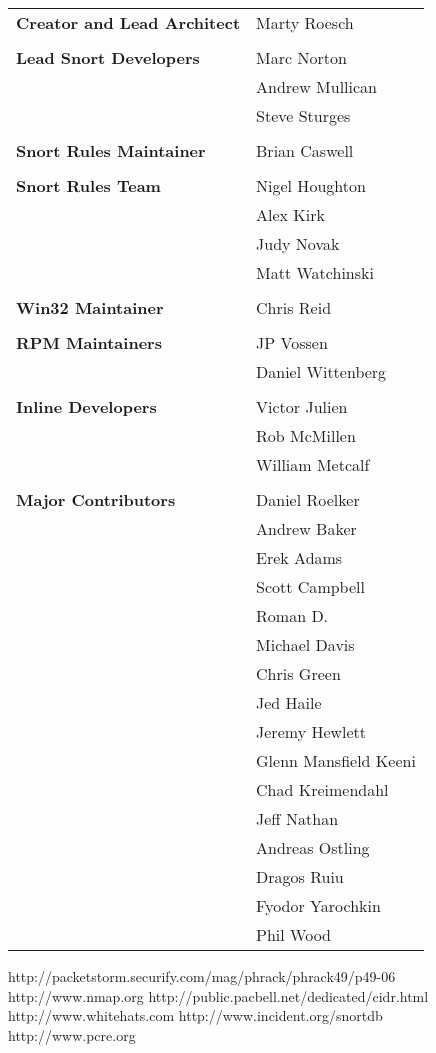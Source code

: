 \documentclass[english]{report}
\begin{document}
\begin{tabular}{p{3in} p{3in}}

\textbf{Creator and Lead Architect} &	 Marty Roesch\\
\\
\textbf{Lead Snort Developers} &	 Marc Norton\\
 & 					 Andrew Mullican\\
 & 					 Steve Sturges\\
\\
\textbf{Snort Rules Maintainer} & 	 Brian Caswell\\
\\
\textbf{Snort Rules Team} &		 Nigel Houghton\\
 		& 			Alex Kirk\\
		&			Judy Novak\\
		&			Matt Watchinski\\
\\
\textbf{Win32 Maintainer} &	 	Chris Reid\\
\\
\textbf{RPM Maintainers} &	 	JP Vossen\\
			&		Daniel Wittenberg\\
\\
\textbf{Inline Developers} &	 	Victor Julien\\
				&	Rob McMillen\\
				& 	William Metcalf\\
\\
\textbf{Major Contributors} & 	Daniel Roelker\\
		&		Andrew Baker\\
		&		Erek Adams\\
		&		Scott Campbell\\
		&		Roman D.\\
		&		Michael Davis\\
		&		Chris Green\\
		&		Jed Haile\\
        &	 Jeremy Hewlett\\
		&		Glenn Mansfield Keeni\\
		&		Chad Kreimendahl\\
		&		Jeff Nathan\\
		&		Andreas Ostling\\
		&		Dragos Ruiu\\
		&		Fyodor Yarochkin\\
		&		Phil Wood
\end{tabular}
\appendix

\begin{thebibliography}{99}
http://packetstorm.securify.com/mag/phrack/phrack49/p49-06
http://www.nmap.org
http://public.pacbell.net/dedicated/cidr.html
http://www.whitehats.com
http://www.incident.org/snortdb
http://www.pcre.org
\end{thebibliography}
\end{document}
